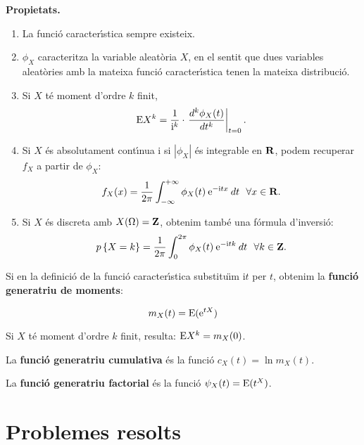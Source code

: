 {\bf Propietats.}

\begin{enumerate}
\item La funci\'o caracter\'{\i}stica sempre existeix.

\item $\phi_X$ caracteritza la variable aleat\`oria $X$, en el sentit que dues
variables aleat\`ories amb la mateixa funci\'o caracter\'{\i}stica tenen la
mateixa
distribuci\'o.

\item Si $X$ t\'e moment d'ordre $k$ finit,
$${\rm E}X^k = {1 \over {\rm i}^k} \cdot \left. {d^k \phi_X(t) \over dt^k}
\right|_{t=0}.$$

\item Si $X$ \'es absolutament cont\'{\i}nua i si $|\phi_X|$ \'es integrable 
en ${\bf R}$, podem recuperar $f_X$ a partir de $\phi_X$:
$$f_X(x) = { 1 \over 2 \pi} \int_{-\infty}^{+\infty} \phi_X(t) \> {\rm e}^{-{\rm
i}tx} \> dt \ \ \forall x \in {\bf R}.$$

\item Si $X$ \'es discreta amb $X(\Omega) ={\bf Z}$, obtenim tamb\'e una f\'ormula
d'inversi\'o:
$$p\left\{X = k\right\} = { 1 \over 2 \pi} \int_{0}^{2 \pi} \phi_X(t) \> {\rm e}^{-{\rm i}tk} \>
dt \ \ \forall k \in {\bf Z}.$$

\end{enumerate}

\begin{defin}
Si en la definici\'o de la funci\'o caracter\'{\i}stica substitu\"{\i}m 
{\rm i}$t$ per $t$, obtenim la {\bf funci\'o generatriu de
moments}:

$$m_X(t) = {\rm E}({\rm e}^{tX})$$

Si $X$ t\'e moment d'ordre $k$ finit, resulta: ${\rm E} X^k = m_X(0)$.
\end{defin}

\begin{defin}
La {\bf funci\'o generatriu
cumulativa} 
\'es la funci\'o $c_X(t) = \ln m_X(t)$. \end{defin}

\begin{defin}
La {\bf funci\'o generatriu
factorial} 
\'es la funci\'o $\psi_X(t) ={\rm E} (t^X)$. \end{defin}

\section{Problemes resolts}

